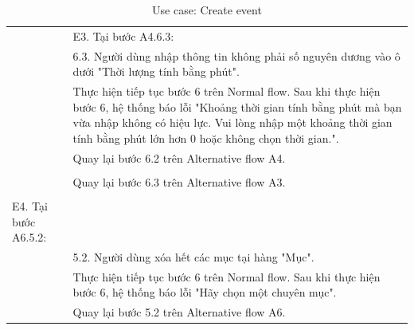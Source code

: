 \documentclass[a4paper, 12pt]{article}
\begin{document}
\begin{table}[H]
\begin{tabular}{|l|p{11cm}|}
        & E3. Tại bước A4.6.3: \\
        & 6.3. Người dùng nhập thông tin không phải số nguyên dương vào ô dưới "Thời lượng tính bằng phút". \\
        & Thực hiện tiếp tục bước 6 trên Normal flow. Sau khi thực hiện bước 6, hệ thống báo lỗi "Khoảng thời gian tính bằng phút mà bạn vừa nhập không có hiệu lực. Vui lòng nhập một khoảng thời gian tính bằng phút lớn hơn 0 hoặc không chọn thời gian.". \\
        & Quay lại bước 6.2 trên Alternative flow A4. \\
        & \\
        & Quay lại bước 6.3 trên Alternative flow A3. \\
        & \\
        E4. Tại bước A6.5.2: \\
        & 5.2. Người dùng xóa hết các mục tại hàng "Mục". \\
        & Thực hiện tiếp tục bước 6 trên Normal flow. Sau khi thực hiện bước 6, hệ thống báo lỗi "Hãy chọn một chuyên mục". \\
        & Quay lại bước 5.2 trên Alternative flow A6. \\
        \hline
    \end{tabular}
    \caption{Use case: Create event}
    \label{Use case: Create event}
\end{table}
\end{document}
